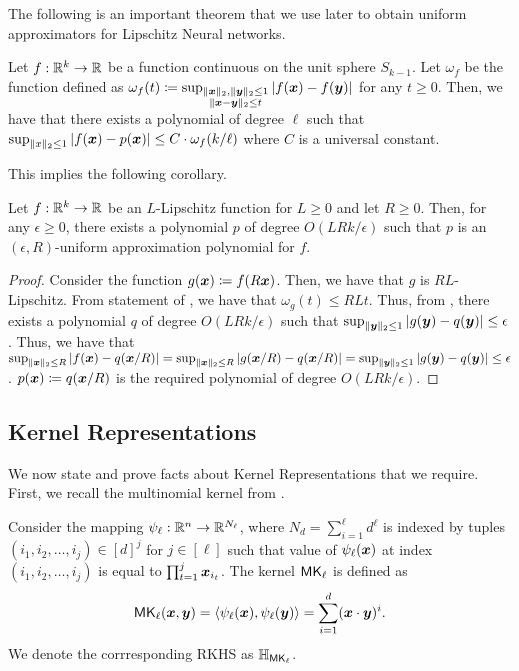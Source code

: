 The following is an important theorem that we use later to obtain uniform approximators for Lipschitz Neural networks.
 \begin{theorem}
\label{thm:jackson}
    Let $f:\mathbb{R}^{k}\to \mathbb{R}$ be a function continuous on the unit sphere $S_{k-1}$. Let $\omega_{f}$ be the function defined as $\omega_{f}(t)\coloneq\sup_{\substack{\|{\bm{x}}\|_{2},\|{\bm{y}}\|_{2}\leq 1\\{\|{\bm{x}}-{\bm{y}}\|_{2}\leq t}}}|f({\bm{x}})-f({\bm{y}})|$ for any $t\geq 0$.
Then, we have that there exists a polynomial of degree $\ell$ such that 
$\sup_{\|x\|_{2}\leq 1}|f({\bm{x}})-p({\bm{x}})|\leq C\cdot \omega_{f}(k/\ell)
$ where $C$ is a universal constant.
\end{theorem} 

This implies the following corollary.
\begin{corollary}
    \label{clry:lipschitz_jackson}
Let $f:\mathbb{R}^{k}\to \mathbb{R}$ be an $L$-Lipschitz function for $L\geq 0$ and let $R\geq 0$. Then, for any $\epsilon\geq 0$, there exists a polynomial $p$ of degree $O(LRk/\epsilon)$ such that $p$ is an $(\epsilon,R)$-uniform approximation polynomial for $f$. 
\end{corollary}
\begin{proof}
    Consider the function $g({\bm{x}})\coloneq f(R{\bm{x}})$. Then, we have that $g$ is $RL$-Lipschitz. From statement of , we have that $\omega_g(t)\leq RLt$. Thus, from , there exists a polynomial $q$ of degree $O(LRk/\epsilon)$ such that $\sup_{\|{\bm{y}}\|_{2}\leq 1}|g({\bm{y}})-q({\bm{y}})|\leq \epsilon$. Thus, we have that $\sup_{\|{\bm{x}}\|_{2}\leq R}|f({\bm{x}})-q({\bm{x}}/R)|=\sup_{\|{\bm{x}}\|_{2}\leq R}|g({\bm{x}}/R)-q({\bm{x}}/R)|=\sup_{\|{\bm{y}}\|_{2}\leq 1}|g({\bm{y}})-q({\bm{y}})|\leq \epsilon$. $p({\bm{x}})\coloneq q({\bm{x}}/R)$ is the required polynomial of degree $O(LRk/\epsilon)$. 
\end{proof}

\subsection{Kernel Representations}
We now state and prove facts about Kernel Representations that we require. First, we recall the multinomial kernel from \cite{reliable_goel2017}.
\begin{definition}
\label{def:multinomial_kernel}
    Consider the mapping $\psi_{\ell}:\mathbb{R}^{n}\to \mathbb{R}^{N_{\ell}}$, where $N_d=\sum_{i=1}^{\ell}d^{\ell}$ is indexed by tuples $(i_1,i_2,\ldots, i_{j})\in [d]^j$ for $j\in [\ell]$ such that value of $\psi_{\ell}({\bm{x}})$ at index $(i_1,i_2,\ldots,i_{j})$ is equal to $\prod_{t=1}^{j}{\bm{x}}_{i_t}$. The kernel $\mathsf{MK}_{\ell}$ is defined as 
    \[
    \mathsf{MK}_{\ell}({\bm{x}},{\bm{y}})=\langle\psi_{\ell}({\bm{x}}),\psi_{\ell}({\bm{y}})\rangle=\sum_{i=1}^{d}({\bm{x}}\cdot{\bm{y}})^{i}.
    \] We denote the corrresponding RKHS as ${\mathbb{H}}_{\mathsf{MK}_{\ell}}$.
\end{definition}

